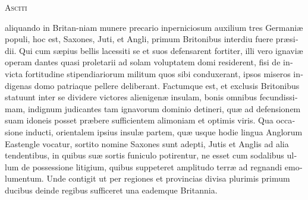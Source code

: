 \documentclass[10pt]{book}
\begin{document}
\begin{paracol}{2}

\begin{otherlanguage}{latin}
\begin{center}
\parbox{4cm}{\footnotesize {}}
\end{center}

\end{otherlanguage}

\switchcolumn

\begin{center}
\parbox{4cm}{\footnotesize {}}
\end{center}

\switchcolumn*

\lettrine[lines=4]{\color{BrickRed}A}{\hspace{-.3cm}sciti} \begin{otherlanguage}{latin}aliquando in Britan-\linebreak{}\hspace*{-.27cm}niam munere precario in\linebreak{}\hspace*{-.13cm}perniciosum auxilium tres Germani\ae{} populi, hoc est, Saxones, Juti, et Angli, primum Britonibus interdiu fuere pr\ae{}sidii. Qui cum s\ae{}pius bellis lacessiti se et suos defensarent fortiter, illi vero ignavi\ae{} operam dantes quasi proletarii ad solam voluptatem domi residerent, fisi de invicta fortitudine stipendiariorum militum quos sibi conduxerant, ipsos miseros indigenas domo patriaque pellere deliberant. Factumque est, et exclusis Britonibus statuunt inter se dividere victores alienigen\ae{} insulam, bonis omnibus fecundissimam, indignum judicantes tam ignavorum dominio detineri, qu\ae{} ad defensionem suam idoneis posset pr\ae{}bere sufficientem alimoniam et optimis viris. Qua occasione inducti, orientalem ipsius insul\ae{} partem, qu\ae{} usque hodie lingua Anglorum Eastengle vocatur, sortito nomine Saxones sunt adepti, Jutis et Anglis ad alia tendentibus, in quibus su\ae{} sortis funiculo potirentur, ne esset cum sodalibus ullum de possessione litigium, quibus suppeteret amplitudo terr\ae{} ad regnandi emolumentum. Unde contigit ut per regiones et provincias divisa plurimis primum ducibus deinde regibus sufficeret una eademque Britannia.
\end{otherlanguage}

\switchcolumn


\end{paracol}
\end{document}
